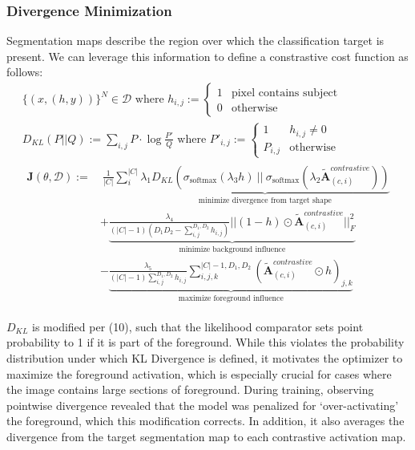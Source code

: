 \documentclass{article}
\theoremstyle{plain}
\theoremstyle{definition}
\theoremstyle{remark}
\begin{document}
\subsubsection{Divergence Minimization}
Segmentation maps describe the region over which the classification target is present. We can leverage this information to define a constrastive cost function as follows:
\begin{gather}
	\{(x, (h, y))\}^N \in \mathcal{D} \text{ where } h_{i,j} := \begin{cases}
		1 & \text{pixel contains subject} \\
		0 & \text{otherwise}
	\end{cases} \\
	D_{KL}(P || Q) := \sum_{i,j} P \cdot \log \frac{P'}{Q} \text{ where } 
	P'_{i,j} := \begin{cases}
		1 & h_{i,j} \neq 0 \\
		P_{i,j} & \text{otherwise}
	\end{cases} \label{d_kl} \\
	\begin{split}
		\mathcal{\bm{J}}(\theta, \mathcal{D}) := &\ \frac{1}{|C|} \sum^{|C|}_{i} \underbrace{\lambda_1 D_{KL}(\sigma_{\text{softmax}}(\lambda_3 h)\ ||\ \sigma_{\text{softmax}}(\lambda_2 \tilde{\mathcal{\bm{A}}}^{\textit{contrastive}}_{(c, i)}))}_{\text{minimize divergence from target shape}} \\
		&+ \underbrace{\frac{\lambda_4}{(|C| - 1) \left(D_1 D_2 - \sum^{D_1,D_2}_{i,j}h_{i,j}\right)} || (1 - h) \odot \tilde{\mathcal{\bm{A}}}^{\textit{contrastive}}_{(c, i)}||^2_F}_{\text{minimize background influence}} \\
		&- \underbrace{\frac{\lambda_5}{(|C| - 1) \sum^{D_1,D_2}_{i,j}h_{i,j}} \sum^{|C|-1,D_1,D_2}_{i,j,k} \left(\tilde{\mathcal{\bm{A}}}^{\textit{contrastive}}_{(c,i)} \odot h\right)_{j,k} }_{\text{maximize foreground influence}}
	\end{split}
\end{gather}

$D_{KL}$ is modified per (10), such that the likelihood comparator sets point probability to 1 if it is part of the foreground. While this violates the probability distribution under which KL Divergence is defined, it motivates the optimizer to maximize the foreground activation, which is especially crucial for cases where the image contains large sections of foreground. During training, observing pointwise divergence revealed that the model was penalized for `over-activating' the foreground, which this modification corrects. In addition, it also averages the divergence from the target segmentation map to each contrastive activation map.
\end{document}
